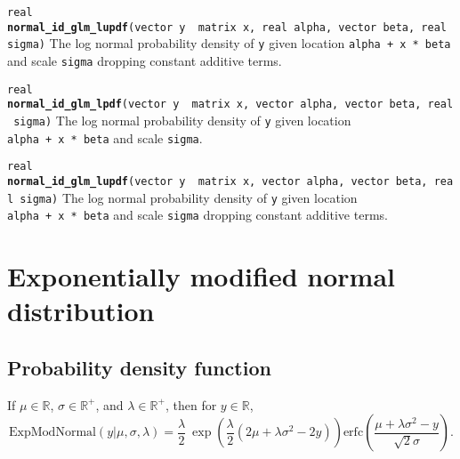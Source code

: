 \documentclass[
  10pt,
]{book}
\begin{document}

\texttt{real} \textbf{\texttt{normal\_id\_glm\_lupdf}}\texttt{(vector\ y\ \textbar{}\ matrix\ x,\ real\ alpha,\ vector\ beta,\ real\ sigma)}\newline
The log normal probability density of \texttt{y} given location \texttt{alpha\ +\ x\ *\ beta}
and scale \texttt{sigma} dropping constant additive terms.


\texttt{real} \textbf{\texttt{normal\_id\_glm\_lpdf}}\texttt{(vector\ y\ \textbar{}\ matrix\ x,\ vector\ alpha,\ vector\ beta,\ real\ sigma)}\newline
The log normal probability density of \texttt{y} given location \texttt{alpha\ +\ x\ *\ beta}
and scale \texttt{sigma}.


\texttt{real} \textbf{\texttt{normal\_id\_glm\_lupdf}}\texttt{(vector\ y\ \textbar{}\ matrix\ x,\ vector\ alpha,\ vector\ beta,\ real\ sigma)}\newline
The log normal probability density of \texttt{y} given location \texttt{alpha\ +\ x\ *\ beta}
and scale \texttt{sigma} dropping constant additive terms.

\hypertarget{exponentially-modified-normal-distribution}{%
\section{Exponentially modified normal distribution}\label{exponentially-modified-normal-distribution}}

\hypertarget{probability-density-function-1}{%
\subsection{Probability density function}\label{probability-density-function-1}}

If \(\mu \in \mathbb{R}\), \(\sigma \in \mathbb{R}^+\), and \(\lambda \in \mathbb{R}^+\), then for \(y \in \mathbb{R}\), \[
\text{ExpModNormal}(y|\mu,\sigma,\lambda) = \frac{\lambda}{2} \ \exp
\left(\frac{\lambda}{2} \left(2\mu + \lambda \sigma^2 -
2y\right)\right) \text{erfc}\left(\frac{\mu + \lambda\sigma^2 -
y}{\sqrt{2}\sigma}\right) . \]
\end{document}
